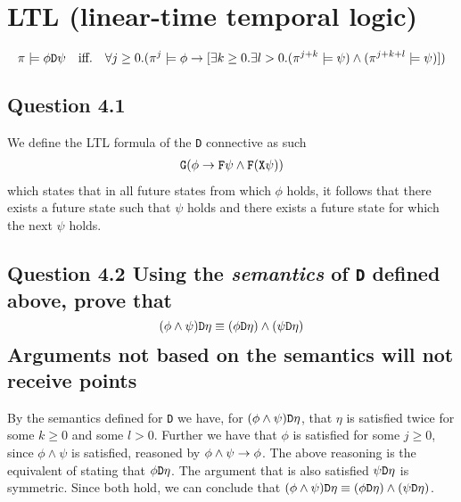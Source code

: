 \section{LTL (linear-time temporal logic)}

\[
	\pi \models \phi \text{\tt D} \psi
	\quad \text{iff.} \quad
	\forall j \geq 0.(\pi^j \models \phi \to
	[\exists k \geq 0.\exists l > 0.(\pi^{j+k} \models \psi)
	\land (\pi^{j+k+l} \models \psi)])
\]

\subsection*{Question 4.1}
We define the LTL formula of the {\tt D} connective as such
\begin{align*}
	\text{\tt G}( \phi \to \text{\tt F}\psi \land \text{\tt F}(\text{\tt X}\psi) )
\end{align*}
which states that in all future states from which $\phi$ holds, it follows
that there exists a future state such that $\psi$ holds and there exists a
future state for which the next $\psi$ holds.

\subsection*{Question 4.2 \mdseries Using the {\it semantics} of {\tt D}
defined above, prove that \[(\phi \land \psi)\text{\tt D}\eta \equiv
(\phi\text{\tt D}\eta) \land (\psi\text{\tt D}\eta)\]
Arguments not based on the semantics will not receive points}

By the semantics defined for {\tt D} we have, for $(\phi \land \psi)
\text{\tt D} \eta$, that $\eta$ is satisfied twice for some $k \geq 0$ and
some $l > 0$. Further we have that $\phi$ is satisfied for some $j \geq 0$,
since $\phi \land \psi$ is satisfied, reasoned by $\phi \land \psi \to \phi$.
The above reasoning is the equivalent of stating that $\phi \text{\tt D}
\eta$. The argument that is also satisfied $\psi \text{\tt D} \eta$ is
symmetric. Since both hold, we can conclude that $(\phi \land \psi)
\text{\tt D}\eta \equiv (\phi\text{\tt D}\eta) \land (\psi\text{\tt D}\eta)$.
